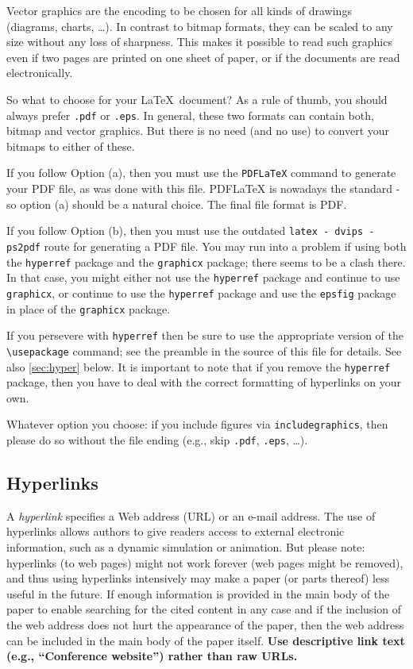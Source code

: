 \documentclass{scspaperproc}
\theoremstyle{scsthe}
\begin{document}
    Vector graphics are the encoding to be chosen for all kinds of drawings (diagrams, charts, \ldots). In contrast to bitmap formats, they can be scaled to any size without any loss of sharpness. This makes it possible to read such graphics even if two pages are printed on one sheet of paper, or if the documents are read electronically.

    So what to choose for your \LaTeX\ document? As a rule of thumb, you should always prefer \texttt{.pdf} or \texttt{.eps}.
    In general, these two formats can contain both, bitmap and vector graphics. But there is no need (and no use) to convert your bitmaps to either of these.

    If you follow Option (a), then you must use the \texttt{PDFLaTeX} command to generate your PDF file, as was done with this file. PDFLaTeX is nowadays the standard - so option (a) should be a natural choice. The final file format is PDF.

    If you follow Option (b), then you must use the outdated \texttt{latex - dvips - ps2pdf} route for generating a PDF file. You may run into a problem if using both the \texttt{hyperref} package and the \texttt{graphicx} package; there seems to be a clash there.
    In that case, you might either not use the \texttt{hyperref} package and continue to use \texttt{graphicx}, or continue to use the \texttt{hyperref} package and use the \texttt{epsfig} package in place of the \texttt{graphicx} package.

    If you persevere with \texttt{hyperref} then be sure to use the appropriate version of the \verb+\usepackage+ command; see the preamble in the source of this file for details. See also \autoref{sec:hyper} below. It is important to note that if you remove the \texttt{hyperref} package, then you have to deal with the correct formatting of hyperlinks on your own.

    Whatever option you choose: if you include figures via \texttt{includegraphics}, then please do so without the file ending (e.g., skip \texttt{.pdf}, \texttt{.eps}, \ldots).

    \subsection{Hyperlinks}
    \label{sec:hyper}

    A \emph{hyperlink} specifies a Web address (URL) or an e-mail address. The use of hyperlinks allows authors to give readers access to external electronic information, such as a dynamic simulation or animation.
    But please note: hyperlinks (to web pages) might not work forever (web pages might be removed), and thus using hyperlinks intensively may make a paper (or parts thereof) less useful in the future. If enough information is provided in the main body of the paper to enable searching for the cited content in any case and if the inclusion of the web address does not hurt the appearance of the paper, then the web address can be included in the main body of the paper itself. \textbf{Use descriptive link text (e.g., ``Conference website'') rather than raw URLs.}
\end{document}
